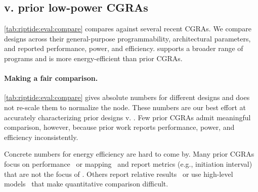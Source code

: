 \subsection{\riptide v. prior low-power CGRAs}
\label{riptide:eval:compare}
\autoref{tab:riptide:eval:compare} compares \riptide against several recent CGRAs.
% 
We compare designs across their general-purpose programmability, architectural parameters, and reported performance, power, and efficiency.
% 
\riptide supports a broader range of programs and is more energy-efficient than prior CGRAs.
%

\paragraph{Making a fair comparison.}
\autoref{tab:riptide:eval:compare} gives absolute numbers for different designs and does not re-scale them to normalize the node.
% 
These numbers are our best effort at accurately characterizing prior designs v. \riptide.
%
Few prior CGRAs admit meaningful comparison, however, because prior work reports performance, power, and efficiency inconsistently.

Concrete numbers for energy efficiency are hard to come by.
%
Many prior CGRAs focus on performance~\cite{plasticine,voitsechov2014single} or mapping~\cite{4dcgra,lee2021ultra,himap} and report metrics (e.g., initiation interval) that are not the focus of \riptide.
% 
Others report relative results~\cite{torng2021ultra,nguyen2021fifer} or use high-level models~\cite{weng2020hybrid,nguyen2021fifer} that make quantitative comparison difficult.
%

